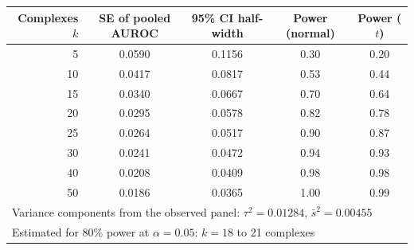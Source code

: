 \begin{tabular}{rcccc}
\toprule
Complexes $k$ & SE of pooled AUROC & 95\% CI half-width & Power (normal) & Power ($t$) \\
\midrule
5 & 0.0590 & 0.1156 & 0.30 & 0.20 \\
10 & 0.0417 & 0.0817 & 0.53 & 0.44 \\
15 & 0.0340 & 0.0667 & 0.70 & 0.64 \\
20 & 0.0295 & 0.0578 & 0.82 & 0.78 \\
25 & 0.0264 & 0.0517 & 0.90 & 0.87 \\
30 & 0.0241 & 0.0472 & 0.94 & 0.93 \\
40 & 0.0208 & 0.0409 & 0.98 & 0.98 \\
50 & 0.0186 & 0.0365 & 1.00 & 0.99 \\
\midrule
\multicolumn{5}{l}{Variance components from the observed panel: $\tau^2 = 0.01284$, $\bar{s}^2 = 0.00455$} \\
\multicolumn{5}{l}{Estimated for 80\% power at $\alpha = 0.05$: $k = 18$ to 21 complexes} \\
\bottomrule
\end{tabular}
